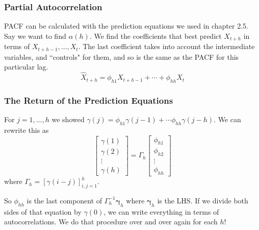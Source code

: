 \documentclass{beamer}
\begin{document}
% 
% 
% 
% 
% 
% 


\begin{frame}
\frametitle{Partial Autocorrelation}

PACF can be calculated with the prediction equations we used in chapter 2.5. Say we want to find $\alpha(h)$.
We find the coefficients that best predict $X_{t+h}$ in terms of $X_{t+h-1},\ldots,X_t$. The last coefficient takes into account the intermediate variables, and ``controls" for them, and so is the same as the PACF for this particular lag.
\[
\hat{X}_{t+h} = \phi_{h1} X_{t+h-1} + \cdots +  \phi_{hh} X_{t}
\]



\end{frame}


\begin{frame}
\frametitle{The Return of the Prediction Equations}

For $j=1,\ldots,h$ we showed $\gamma(j) = \phi_{h1}\gamma(j-1) + \cdots \phi_{hh} \gamma(j-h)$. We can rewrite this as 
\[
\left[ \begin{array}{c}
\gamma(1) \\
\gamma(2) \\
\vdots \\
\gamma(h)
\end{array}\right]
=
\Gamma_h
\left[ \begin{array}{c}
\phi_{h1} \\
\phi_{h2} \\
\vdots \\
\phi_{hh}
\end{array}\right]
\]
where $\Gamma_h = [\gamma(i-j)]_{i,j=1}^h$. 
\newline

So $\phi_{hh}$ is the last component of $\Gamma_h^{-1} \bm{\gamma}_h$ where $\bm{\gamma}_h$ is the LHS. If we divide both sides of that equation by $\gamma(0)$, we can write everything in terms of autocorrelations. We do that procedure over and over again for each $h$!


\end{frame}
\end{document}
